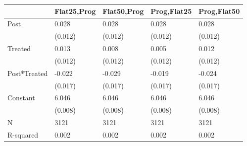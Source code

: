 \begin{tabular}{lllll}
\toprule
 & Flat25,Prog & Flat50,Prog & Prog,Flat25 & Prog,Flat50 \\
\midrule
Post & 0.028 & 0.028 & 0.028 & 0.028 \\
 & (0.012) & (0.012) & (0.012) & (0.012) \\
Treated & 0.013 & 0.008 & 0.005 & 0.012 \\
 & (0.012) & (0.012) & (0.012) & (0.012) \\
Post*Treated & -0.022 & -0.029 & -0.019 & -0.024 \\
 & (0.017) & (0.017) & (0.017) & (0.017) \\
Constant & 6.046 & 6.046 & 6.046 & 6.046 \\
 & (0.008) & (0.008) & (0.008) & (0.008) \\
N & 3121 & 3121 & 3121 & 3121 \\
R-squared & 0.002 & 0.002 & 0.002 & 0.002 \\
\bottomrule
\end{tabular}
